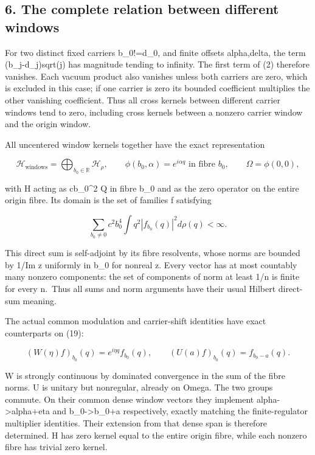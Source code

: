 \documentclass[
  11pt,
]{article}
\begin{document}
\subsection{6. The complete relation between different
windows}\label{weak-coupling-part-5-the-complete-relation-between-different-windows}

For two distinct fixed carriers b\_0!=d\_0, and finite offsets
alpha,delta, the term (b\_j-d\_j)sqrt(j) has magnitude tending to
infinity. The first term of (2) therefore vanishes. Each vacuum product
also vanishes unless both carriers are zero, which is excluded in this
case; if one carrier is zero its bounded coefficient multiplies the
other vanishing coefficient. Thus all cross kernels between different
carrier windows tend to zero, including cross kernels between a nonzero
carrier window and the origin window.

All uncentered window kernels together have the exact representation

\[
 \mathcal H_{\mathrm{windows}}
   =\bigoplus_{b_0\in\mathbb R}\mathcal H_\rho,
 \qquad
 \phi(b_0,\alpha)=e^{i\alpha q}\text{ in fibre }b_0,
 \qquad \Omega=\phi(0,0),
 \tag{19}
\]

with H acting as cb\_0\^{}2 Q in fibre b\_0 and as the zero operator on
the entire origin fibre. Its domain is the set of families f satisfying

\[
 \sum_{b_0\ne0}c^2b_0^4\int q^2|f_{b_0}(q)|^2d\rho(q)<\infty.
\]

This direct sum is self-adjoint by its fibre resolvents, whose norms are
bounded by 1/\textbar Im z\textbar{} uniformly in b\_0 for nonreal z.
Every vector has at most countably many nonzero components: the set of
components of norm at least 1/n is finite for every n.~Thus all sums and
norm arguments have their usual Hilbert direct-sum meaning.

The actual common modulation and carrier-shift identities have exact
counterparts on (19):

\[
 (W(\eta)f)_{b_0}(q)=e^{i\eta q}f_{b_0}(q),\qquad
 (U(a)f)_{b_0}(q)=f_{b_0-a}(q).
 \tag{20}
\]

W is strongly continuous by dominated convergence in the sum of the
fibre norms. U is unitary but nonregular, already on Omega. The two
groups commute. On their common dense window vectors they implement
alpha-\textgreater alpha+eta and b\_0-\textgreater b\_0+a respectively,
exactly matching the finite-regulator multiplier identities. Their
extension from that dense span is therefore determined. H has zero
kernel equal to the entire origin fibre, while each nonzero fibre has
trivial zero kernel.
\end{document}
